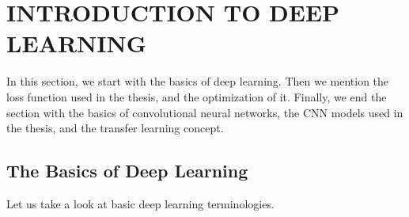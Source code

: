 \chapter{INTRODUCTION TO DEEP LEARNING}\label{ch:CH3}

In this section, we start with the basics of deep learning. Then we mention the loss function used in the thesis, and the optimization of it. Finally, we end the section with the basics of convolutional neural networks, the CNN models used in the thesis, and the transfer learning concept.

\begin{figure}[h]
	\centering
	\vspace*{1mm}
	\label{basic_neuron}
\end{figure}

\section{The Basics of Deep Learning}

Let us take a look at basic deep learning terminologies. 

